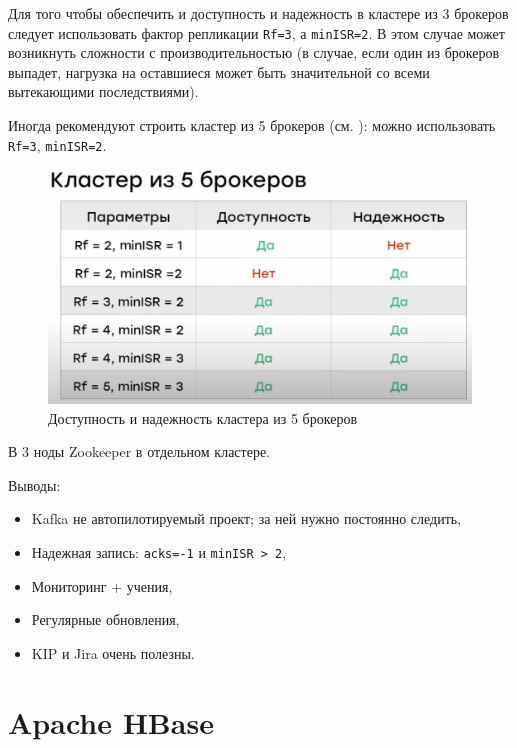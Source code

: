 \documentclass[%
	11pt,
	a4paper,
	utf8,
		]{article}
\begin{document}
Для того чтобы обеспечить и доступность и надежность в кластере из 3 брокеров следует использовать фактор репликации \texttt{Rf=3}, а \texttt{minISR=2}. В этом случае может возникнуть сложности с производительностью (в случае, если один из брокеров выпадет, нагрузка на оставшиеся может быть значительной со всеми вытекающими последствиями).

Иногда рекомендуют строить кластер из 5 брокеров (см. ): можно использовать \texttt{Rf=3}, \texttt{minISR=2}.

\begin{figure}[h]
	\centering
	\includegraphics[scale=0.55]{figures/cluster5brokers.png}
	\caption{ Доступность и надежность кластера из 5 брокеров }\label{fig:cluster5brokers}
\end{figure}

В 3 ноды Zookeeper в отдельном кластере.

Выводы:
\begin{itemize}
	\item Kafka не автопилотируемый проект; за ней нужно постоянно следить,
	
	\item Надежная запись: \texttt{acks=-1} и \texttt{minISR > 2},
	
	\item Мониторинг + учения,
	
	\item Регулярные обновления,
	
	\item KIP и Jira очень полезны.
\end{itemize}


\section{Apache HBase}
\end{document}
